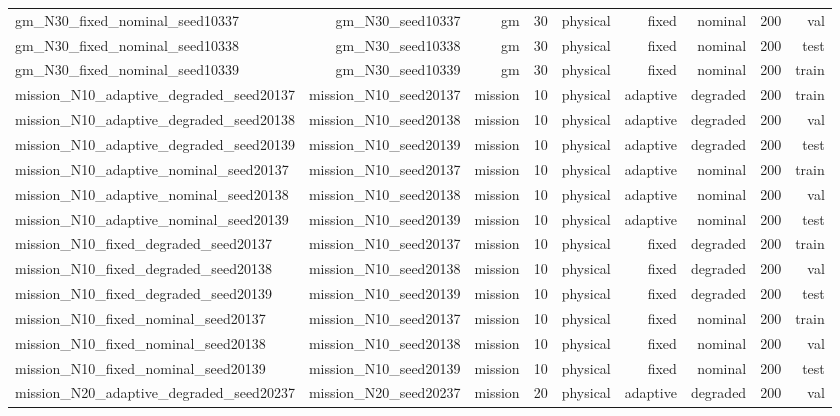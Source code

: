 \begin{tabular}{lrrrrrrrr}
gm\_N30\_fixed\_nominal\_seed10337 & gm\_N30\_seed10337 & gm & 30 & physical & fixed & nominal & 200 & val \\
gm\_N30\_fixed\_nominal\_seed10338 & gm\_N30\_seed10338 & gm & 30 & physical & fixed & nominal & 200 & test \\
gm\_N30\_fixed\_nominal\_seed10339 & gm\_N30\_seed10339 & gm & 30 & physical & fixed & nominal & 200 & train \\
mission\_N10\_adaptive\_degraded\_seed20137 & mission\_N10\_seed20137 & mission & 10 & physical & adaptive & degraded & 200 & train \\
mission\_N10\_adaptive\_degraded\_seed20138 & mission\_N10\_seed20138 & mission & 10 & physical & adaptive & degraded & 200 & val \\
mission\_N10\_adaptive\_degraded\_seed20139 & mission\_N10\_seed20139 & mission & 10 & physical & adaptive & degraded & 200 & test \\
mission\_N10\_adaptive\_nominal\_seed20137 & mission\_N10\_seed20137 & mission & 10 & physical & adaptive & nominal & 200 & train \\
mission\_N10\_adaptive\_nominal\_seed20138 & mission\_N10\_seed20138 & mission & 10 & physical & adaptive & nominal & 200 & val \\
mission\_N10\_adaptive\_nominal\_seed20139 & mission\_N10\_seed20139 & mission & 10 & physical & adaptive & nominal & 200 & test \\
mission\_N10\_fixed\_degraded\_seed20137 & mission\_N10\_seed20137 & mission & 10 & physical & fixed & degraded & 200 & train \\
mission\_N10\_fixed\_degraded\_seed20138 & mission\_N10\_seed20138 & mission & 10 & physical & fixed & degraded & 200 & val \\
mission\_N10\_fixed\_degraded\_seed20139 & mission\_N10\_seed20139 & mission & 10 & physical & fixed & degraded & 200 & test \\
mission\_N10\_fixed\_nominal\_seed20137 & mission\_N10\_seed20137 & mission & 10 & physical & fixed & nominal & 200 & train \\
mission\_N10\_fixed\_nominal\_seed20138 & mission\_N10\_seed20138 & mission & 10 & physical & fixed & nominal & 200 & val \\
mission\_N10\_fixed\_nominal\_seed20139 & mission\_N10\_seed20139 & mission & 10 & physical & fixed & nominal & 200 & test \\
mission\_N20\_adaptive\_degraded\_seed20237 & mission\_N20\_seed20237 & mission & 20 & physical & adaptive & degraded & 200 & val \\

\end{tabular}
